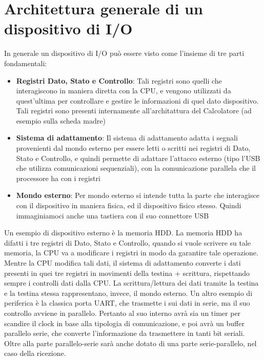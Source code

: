 \section{Architettura generale di un dispositivo di I/O}
In generale un dispositivo di I/O può essere visto come l'insieme di tre parti fondamentali:

\begin{itemize}

    \item \textbf{Registri Dato, Stato e Controllo}: Tali registri sono quelli che interagiscono in maniera diretta con la CPU, e vengono utilizzati da quest'ultima per controllare e gestire le informazioni di quel dato dispositivo. Tali registri sono presenti internamente all'architattura del Calcolatore (ad esempio sulla scheda madre)

    \item \textbf{Sistema di adattamento}: Il sistema di adattamento adatta i segnali provenienti dal mondo esterno per essere letti o scritti nei registri di Dato, Stato e Controllo, e quindi permette di adattare l'attacco esterno (tipo l'USB che utilizza comunicazioni sequenziali), con la comunicazione parallela che il processore ha con i registri

    \item \textbf{Mondo esterno}: Per mondo esterno si intende tutta la parte che interagisce con il dispositivo in maniera fisica, ed il dispositivo fisico stesso. Quindi immaginiamoci anche una tastiera con il suo connettore USB

\end{itemize}

Un esempio di dispositivo esterno è la memoria HDD.
La memoria HDD ha difatti i tre registri di Dato, Stato e Controllo, quando si vuole scrivere su tale memoria, la CPU va a modificare i registri in modo da garantire tale operazione. Mentre la CPU modifica tali dati, il sistema di adattamento converte i dati presenti in quei tre registri in movimenti della testina + scrittura, rispettando sempre i controlli dati dalla CPU. La scrittura/lettura dei dati tramite la testina e la testina stessa rappresentano, invece, il mondo esterno.
Un altro esempio di periferica è la classica porta UART, che trasmette i sui dati in serie, ma il suo controllo avviene in parallelo. Pertanto al suo interno avrà sia un timer per scandire il clock in base alla tipologia di comunicazione, e poi avrà un buffer parallelo serie, che converte l'informazione da trasmettere in tanti bit seriali. Oltre alla parte parallelo-serie sarà anche dotato di una parte serie-parallelo, nel caso della ricezione.


